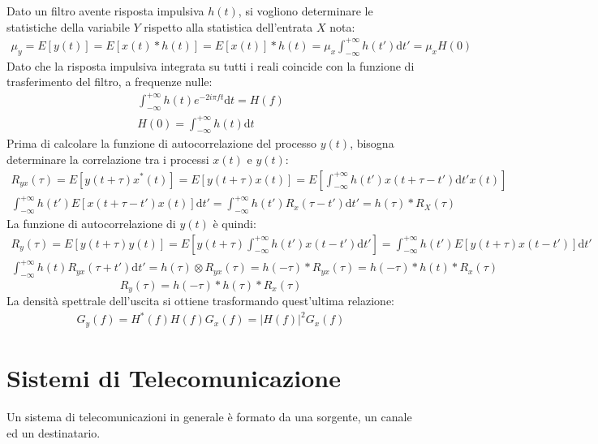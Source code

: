 \documentclass{article}
\newcommand{\df}{\mathrm{d}}
\numberwithin{equation}{subsection}
\begin{document}
Dato un filtro avente risposta impulsiva $h(t)$, si vogliono determinare le statistiche della variabile $Y$ rispetto alla statistica dell'entrata $X$ nota:
\begin{gather*}
    \mu_y=E[y(t)]=E[x(t)*h(t)]=E[x(t)]*h(t)=\displaystyle\mu_x\int_{-\infty}^{+\infty}h(t')\df t'=\mu_xH(0)
\end{gather*}
Dato che la risposta impulsiva integrata su tutti i reali coincide con la funzione di trasferimento del filtro, a frequenze nulle:
\begin{gather*}
    \displaystyle\int_{-\infty}^{+\infty}h(t)e^{-2i\pi ft}\df t=H(f)\\
    H(0)=\displaystyle\int_{-\infty}^{+\infty}h(t)\df t
\end{gather*}
Prima di calcolare la funzione di autocorrelazione del processo $y(t)$, bisogna determinare la correlazione tra i processi $x(t)$ e $y(t)$:
\begin{gather*}
    R_{yx}(\tau)=E[y(t+\tau)x^*(t)]=E[y(t+\tau)x(t)]=E\left[\displaystyle\int_{-\infty}^{+\infty}h(t')x(t+\tau-t')\df t'x(t)\right]\\
    \displaystyle\int_{-\infty}^{+\infty}h(t')E[x(t+\tau-t')x(t)]\df t'=\displaystyle\int_{-\infty}^{+\infty}h(t')R_x(\tau-t')\df t'=h(\tau)*R_X(\tau)
\end{gather*}
La funzione di autocorrelazione di $y(t)$ è quindi:
\begin{gather*}
    R_y(\tau)=E[y(t+\tau)y(t)]=E\left[y(t+\tau)\displaystyle\int_{-\infty}^{+\infty}h(t')x(t-t')\df t'\right]=\int_{-\infty}^{+\infty}h(t')E[y(t+\tau)x(t-t')]\df t'\\
    \displaystyle\int_{-\infty}^{+\infty}h(t)R_{yx}(\tau+t')\df t'=h(\tau)\otimes R_{yx}(\tau)=h(-\tau)*R_{yx}(\tau)=h(-\tau)*h(t)*R_x(\tau)
\end{gather*}
\begin{equation}
    R_y(\tau)=h(-\tau)*h(\tau)*R_x(\tau)
\end{equation}
La densità spettrale dell'uscita si ottiene trasformando quest'ultima relazione:
\begin{gather}
    G_y(f)=H^*(f)H(f)G_x(f)=|H(f)|^2G_x(f)
\end{gather}

\clearpage

\section{Sistemi di Telecomunicazione}

Un sistema di telecomunicazioni in generale è formato da una sorgente, un canale ed un destinatario. 
\end{document}
